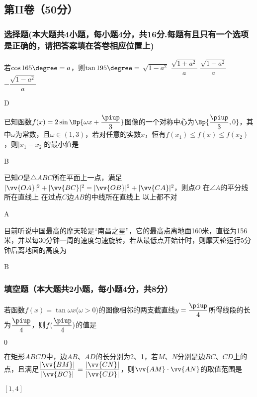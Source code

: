 \begin{exercise}
\part{第II卷（50分）}
\vspace{-1.5em}
\section{选择题(本大题共4小题，每小题4分，共16分.每题有且只有一个选项是正确的，请把答案填在答卷相应位置上)}
  \item
    若$\cos{165\degree}=a$，则$\tan{195\degree}=$\xz
      \xx
       {$\sqrt{1-a^2}$}
       {$\dfrac{\sqrt{1+a^2}}a$}
       {$\dfrac{\sqrt{1-a^2}}a$}
       {$-\dfrac{\sqrt{1-a^2}}a$}
    \begin{answer}
      D
    \end{answer}
  \item
    已知函数$f(x)=2\sin\Bp{\omega x+\dfrac{\piup}3}$图像的一个对称中心为$\Bp{\dfrac{\piup}3,0}$，其中$\omega$为常数，且$\omega\in(1,3)$，若对任意的实数$x$，恒有$f(x_1)\leq f(x)\leq f(x_2)$，则$|x_1-x_2|$的最小值是\xz
    \begin{answer}
      B
    \end{answer}
  \item
    已知$O$是$\triangle{ABC}$所在平面上一点，满足$|\vv{OA}|^2+|\vv{BC}|^2=|\vv{OB}|^2+|\vv{CA}|^2$，则点$O$\xz
       {在$\angle{A}$的平分线所在直线上}
       {在过点$C$边$AB$的中线所在直线上}
       {以上都不对}
    \begin{answer}
      A
    \end{answer}
  \item
    目前听说中国最高的摩天轮是“南昌之星”，它的最高点离地面160米，直径为156米，并以每30分钟一周的速度匀速旋转，若从最低点开始计时，则摩天轮运行5分钟后离地面的高度为\xz
    \begin{answer}
      B
    \end{answer}
\section{填空题（本大题共2小题，每小题4分，共8分）}
  \item
    若函数$f(x)=\tan{\omega x}$($\omega>0$)的图像相邻的两支截直线$y=\dfrac{\piup}4$所得线段的长为$\dfrac{\piup}4$，则$f(\dfrac{\piup}4)$的值是\tk
    \begin{answer}
      $0$
    \end{answer}
  \item
    在矩形$ABCD$中，边$AB$、$AD$的长分别为2、1，若$M$、$N$分别是边$BC$、$CD$上的点，且满足$\dfrac{|\vv{BM}|}{|\vv{BC}|}=\dfrac{|\vv{CN}|}{|\vv{CD}|}$，则$\vv{AM}\cdot\vv{AN}$的取值范围是\tk
    \begin{answer}
      $[1,4]$
    \end{answer}
\newpage

\end{exercise}

